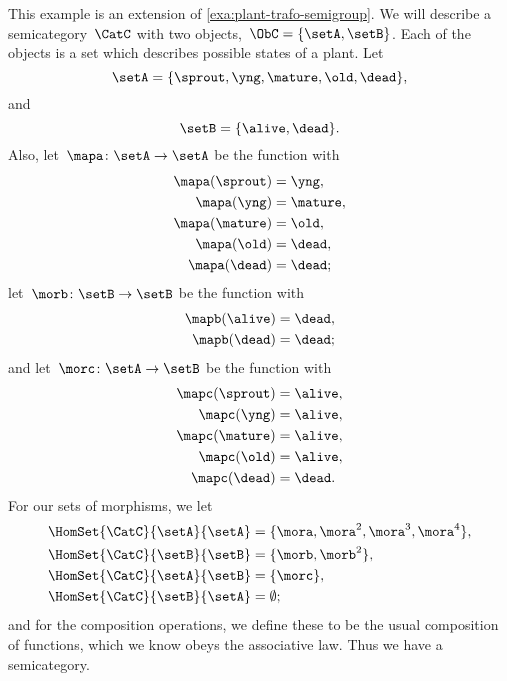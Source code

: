 \begin{example}
	\label{exa:semicat-plant-states}
	This example is an extension of \cref{exa:plant-trafo-semigroup}.
	We will describe a semicategory~$\CatC$ with two objects,~$\ObC = \{ \setA, \setB \}$.
	Each of the objects is a set which describes possible states of a plant.
	Let
	\begin{equation}
		\setA = \{ \sprout, \yng, \mature, \old, \dead \},
	\end{equation}
	and
	\begin{equation}
		\setB = \{ \alive, \dead \}.
	\end{equation}
	Also, let~$\mapa \colon \setA \to \setA$ be the function with
	\begin{align*}
		\mapa(\sprout) & =  \yng,    \\
		\mapa(\yng)    & =  \mature, \\
		\mapa(\mature) & =  \old,    \\
		\mapa( \old)   & = \dead,    \\
		\mapa(\dead)   & = \dead;
	\end{align*}
	let~$\morb \colon \setB \to \setB$ be the function with
	\begin{align*}
		\mapb(\alive) & =  \dead, \\
		\mapb(\dead)  & =  \dead;
	\end{align*}
	and let~$\morc \colon \setA \to \setB$ be the function with
	\begin{align*}
		\mapc(\sprout) & = \alive,  \\
		\mapc(\yng)    & =  \alive, \\
		\mapc(\mature) & = \alive , \\
		\mapc( \old)   & = \alive,  \\
		\mapc (\dead)  & = \dead.
	\end{align*}
	For our sets of morphisms, we let
	\begin{align*}
		\HomSet{\CatC}{\setA}{\setA} & = \{ \mora, \mora^2, \mora^3, \mora^4 \}, \\
		\HomSet{\CatC}{\setB}{\setB} & =  \{ \morb, \morb^2 \},                  \\
		\HomSet{\CatC}{\setA}{\setB} & =  \{ \morc \},                           \\
		\HomSet{\CatC}{\setB}{\setA} & = \emptyset;
	\end{align*}
	and for the composition operations, we define these to be the usual composition of functions, which we know obeys the associative law.
	Thus we have a semicategory.
\end{example}

